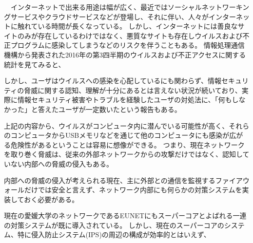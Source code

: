 \begin{comment}
一般に，商用／フリーを問わず現存する多くの汎用ネットワークシミュレータに関して，それぞれが実装している種々のプロトコルモデルについてそのモデル化や実装詳細，基本特性といった項目が明らかにされているものは少ない．そのため，汎用の評価ツールを使用して新たにネットワークを評価する際，モデル化方法や実装内容が明らかになっていることが重要だと言える\cite{joron6}．
本研究に示される方法により，ns-3上で端末やL2スイッチ，L3スイッチの汎用的なモデル化を行い，それを用いて意図した様々なネットワークを構築し，性能評価を行うことができるようになる．
これにより，ns-3上で構築したネットワークの挙動確認や性能評価による改善点の発見を行えるだけでなく，本研究で使用した汎用的なモデルを利用し，新たなネットワークの性能評価を行う際のモデル化や，実装方法の指標とすることができる．
加えて，来年度以降は実際に構築されたEUNETの動作を検証する事でシミュレーションでの計測と実機実験としての計測を行うことができ，シミュレーションを行う際，どのようにEUNETをモデル化する事で，そのモデルが妥当性を持つかを検証する事も可能になると予想される．

本論文では，2章に各シミュレータの比較，シミュレーションを行う上で必要となるネットワーク技術，性能評価量を紹介する．3章にns-3上での大規模ネットワーク構築法と有線ネットワークを構築するために作成したモジュール，4章に作成したモジュールの動作検証について述べ，最後に5章でまとめと今後の課題を述べる．
\end{comment}

　インターネットで出来る用途は幅が広く、最近ではソーシャルネットワーキングサービスやクラウドサービスなどが登場し、それに伴い、人々がインターネットに触れている時間が長くなっている。
しかし、インターネットには善良なサイトのみが存在しているわけではなく、悪質なサイトも存在しウイルスおよび不正プログラムに感染してしまうなどのリスクを伴うこともある。
情報処理通信機構から発表された2016年の第3四半期のウイルスおよび不正アクセスに関する統計を見てみると、

しかし、ユーザはウイルスへの感染を心配しているにも関わらず、情報セキュリティの脅威に関する認知、理解が十分にあるとは言えない状況が続いており、実際に情報セキュリティ被害やトラブルを経験したユーザの対処法に、「何もしなかった」と答えたユーザが一定数いたという報告もある\cite{joron1}。

上記の内容から、ウイルスがコンピュータ内に潜んでいる可能性が高く、それらのコンピュータからUSBメモリなどを通じて他のコンピュータにも感染が広がる危険性があるということは容易に想像ができる。
つまり、現在ネットワークを取り巻く脅威は、従来の外部ネットワークからの攻撃だけではなく、認知していない内部への脅威の侵入もある。

内部への脅威の侵入が考えられる現在、主に外部との通信を監視するファイアウォールだけでは安全と言えず、ネットワーク内部にも何らかの対策システムを実装しておく必要がある。

現在の愛媛大学のネットワークであるEUNETにもスーパーコアとよばれる一連の対策システムが既に導入されている。
しかし、現在のスーパーコアのシステム、特に侵入防止システム(IPS)の周辺の構成が効率的とはいえず、